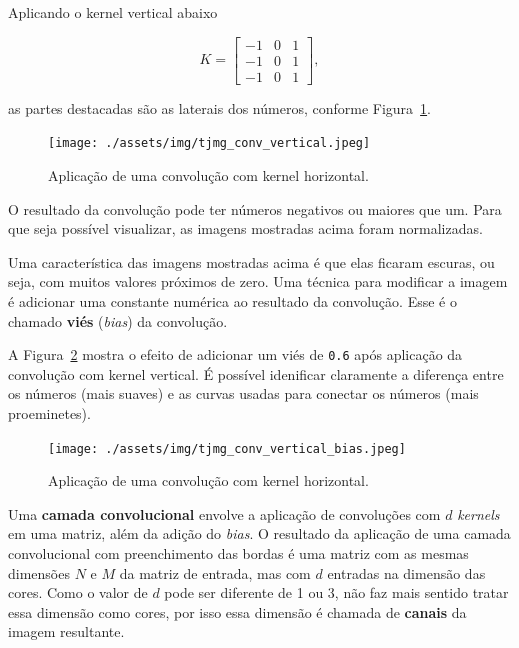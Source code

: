 \documentclass[12pt,twoside,brazilian]{book}
\begin{document}
Aplicando o kernel vertical abaixo

\[
K = \left[\begin{array}{rrr}-1&0&1\\-1&0&1\\-1&0&1\end{array}\right],
\]

as partes destacadas são as laterais dos números, conforme
Figura~\ref{fig-tjmg-exemplo-conv-vertical}.

\begin{figure}

{\centering \texttt{[image: ./assets/img/tjmg\_conv\_vertical.jpeg]}

}

\caption{\label{fig-tjmg-exemplo-conv-vertical}Aplicação de uma
convolução com kernel horizontal.}

\end{figure}

O resultado da convolução pode ter números negativos ou maiores que um.
Para que seja possível visualizar, as imagens mostradas acima foram
normalizadas.

Uma característica das imagens mostradas acima é que elas ficaram
escuras, ou seja, com muitos valores próximos de zero. Uma técnica para
modificar a imagem é adicionar uma constante numérica ao resultado da
convolução. Esse é o chamado \textbf{viés} (\emph{bias}) da convolução.

A Figura~\ref{fig-tjmg-exemplo-conv-vertical-bias} mostra o efeito de
adicionar um viés de \texttt{0.6} após aplicação da convolução com
kernel vertical. É possível idenificar claramente a diferença entre os
números (mais suaves) e as curvas usadas para conectar os números (mais
proeminetes).

\begin{figure}

{\centering \texttt{[image: ./assets/img/tjmg\_conv\_vertical\_bias.jpeg]}

}

\caption{\label{fig-tjmg-exemplo-conv-vertical-bias}Aplicação de uma
convolução com kernel horizontal.}

\end{figure}

Uma \textbf{camada convolucional} envolve a aplicação de convoluções com
\(d\) \emph{kernels} em uma matriz, além da adição do \emph{bias}. O
resultado da aplicação de uma camada convolucional com preenchimento das
bordas é uma matriz com as mesmas dimensões \(N\) e \(M\) da matriz de
entrada, mas com \(d\) entradas na dimensão das cores. Como o valor de
\(d\) pode ser diferente de 1 ou 3, não faz mais sentido tratar essa
dimensão como cores, por isso essa dimensão é chamada de \textbf{canais}
da imagem resultante.
\end{document}
